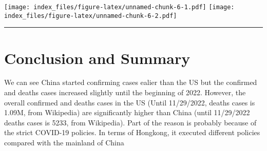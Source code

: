 \documentclass[
]{article}
\begin{document}
\texttt{[image: index\_files/figure-latex/unnamed-chunk-6-1.pdf]}
\texttt{[image: index\_files/figure-latex/unnamed-chunk-6-2.pdf]}

\begin{center}\rule{0.5\linewidth}{0.5pt}\end{center}

\hypertarget{conclusion-and-summary}{%
\section{Conclusion and Summary}\label{conclusion-and-summary}}

We can see China started confirming cases ealier than the US but the
confirmed and deaths cases increased slightly until the beginning of
2022. However, the overall confirmed and deaths cases in the US (Until
11/29/2022, deaths cases is 1.09M, from Wikipedia) are significantly
higher than China (until 11/29/2022 deaths cases is 5233, from
Wikipedia). Part of the reason is probably because of the strict
COVID-19 policies. In terms of Hongkong, it executed different policies
compared with the mainland of China
\end{document}

